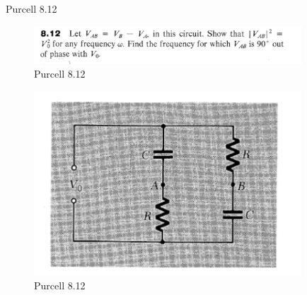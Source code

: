 \documentclass[makesolutionspdf]{esg8022pset}
\begin{document}
\begin{problem}{Purcell 8.12}

\begin{figure}[H]
    \centering
    \includegraphics[width = 10cm]{pu812}
    \caption{Purcell 8.12}
  \end{figure}
  
  \begin{figure}[H]
    \centering
    \includegraphics[width = 10cm]{figpu812}
    \caption{Purcell 8.12}
  \end{figure}
\end{problem}
\end{document}
